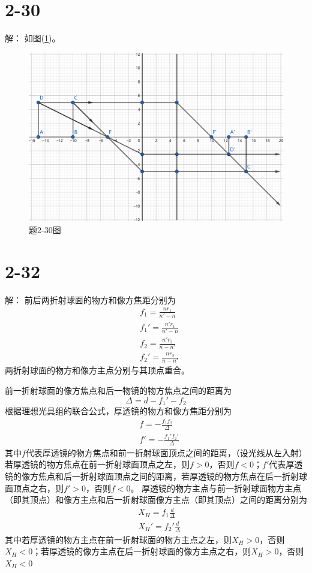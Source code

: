 \documentclass[10pt,a4paper]{article}
\theoremstyle{remark}
\begin{document}
\newpage
\section*{2-30}解：
如图(\ref{OpticsHomework_3Problem_2-30})。
\begin{figure}[h]
\centering
\includegraphics[scale=.25]{OpticsHomework_3Problem_2-30(tailored).png}
\caption{题2-30图}\label{OpticsHomework_3Problem_2-30}
\end{figure}

\newpage
\section*{2-32}解：
前后两折射球面的物方和像方焦距分别为
\begin{align*}
&f_1 = \frac{nr_1}{n' - n}\\
&f_1' = \frac{n'r_1}{n' - n}\\
&f_2 = \frac{n'r_2}{n - n'}\\
&f_2' = \frac{nr_2}{n - n'}
\end{align*}
两折射球面的物方和像方主点分别与其顶点重合。

\noindent 前一折射球面的像方焦点和后一物镜的物方焦点之间的距离为
\[
\Delta = d - f_1' - f_2
\]
根据理想光具组的联合公式，厚透镜的物方和像方焦距分别为
\begin{align*}
&f = -\frac{f_1f_2}{\Delta}\\
&f' = -\frac{f_1'f_2'}{\Delta}
\end{align*}
其中$f$代表厚透镜的物方焦点和前一折射球面顶点之间的距离，（设光线从左入射）若厚透镜的物方焦点在前一折射球面顶点之左，则$f > 0$，否则$f < 0$；$f'$代表厚透镜的像方焦点和后一折射球面顶点之间的距离，若厚透镜的物方焦点在后一折射球面顶点之右，则$f' > 0$，否则$f < 0$。
厚透镜的物方主点与前一折射球面物方主点（即其顶点）和像方主点和后一折射球面像方主点（即其顶点）之间的距离分别为
\begin{align*}
&X_H = f_1\frac{d}{\Delta}\\
&X_H' = f_2'\frac{d}{\Delta}
\end{align*}
其中若厚透镜的物方主点在前一折射球面的物方主点之左，则$X_H > 0$，否则$X_H < 0$；若厚透镜的像方主点在后一折射球面的像方主点之右，则$X_H > 0$，否则$X_H < 0$
\end{document}
